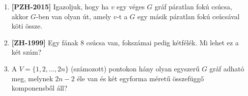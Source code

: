 \documentclass[a4paper,12pt]{article}
\begin{document}
\begin{enumerate}
        \item \textbf{[PZH-2015]} Igazoljuk, hogy ha $v$ egy véges $G$ gráf páratlan fokú csúcsa, akkor $G$-ben van olyan út, amely $v$-t a $G$ egy másik páratlan fokú csúcsával köti össze.



        \item \textbf{[ZH-1999]} Egy fának $8$ csúcsa van, fokszámai pedig kétfélék. Mi lehet ez a két szám?
        
        
        \item A $V=\{1,2, \ldots, 2n \}$ (számozott) pontokon hány olyan egyszerű $G$ gráf adható meg, melynek $2n-2$ éle van és két egyforma méretű összefüggő komponensből áll?
        



\end{enumerate}
\end{document}
